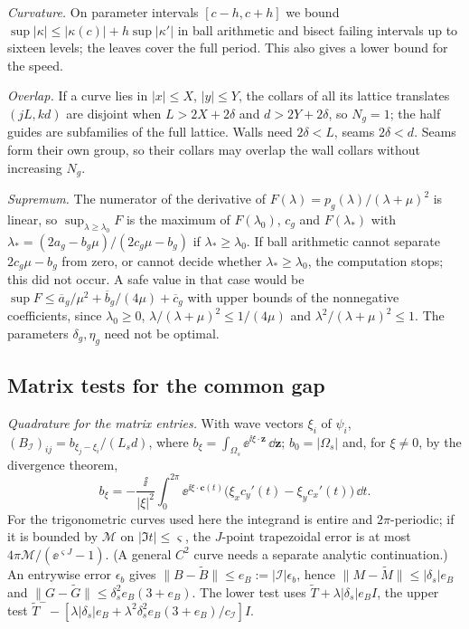 \emph{Curvature.} On parameter intervals $[c-h,c+h]$ we bound
$\sup|\kappa|\le|\kappa(c)|+h\sup|\kappa'|$ in ball arithmetic and bisect failing
intervals up to sixteen levels; the leaves cover the full period. This also gives a
lower bound for the speed.

\emph{Overlap.} If a curve lies in $|x|\le X$, $|y|\le Y$, the collars of all its
lattice translates $(jL,kd)$ are disjoint when $L>2X+2\delta$ and $d>2Y+2\delta$, so
$N_g=1$; the half guides are subfamilies of the full lattice. Walls need $2\delta<L$,
seams $2\delta<d$. Seams form their own group, so their collars may overlap the wall
collars without increasing $N_g$.

\emph{Supremum.} The numerator of the derivative of
$F(\lambda)=p_g(\lambda)/(\lambda+\mu)^2$ is linear, so $\sup_{\lambda\ge\lambda_0}F$ is
the maximum of $F(\lambda_0)$, $c_g$ and $F(\lambda_*)$ with
$\lambda_*=(2a_g-b_g\mu)/(2c_g\mu-b_g)$ if $\lambda_*\ge\lambda_0$. If ball arithmetic
cannot separate $2c_g\mu-b_g$ from zero, or cannot decide whether
$\lambda_*\ge\lambda_0$, the computation stops; this did not occur. A safe value in
that case would be $\sup F\le\overline a_g/\mu^2+\overline b_g/(4\mu)+\overline c_g$
with upper bounds of the nonnegative coefficients, since $\lambda_0\ge0$, $\lambda/(\lambda+\mu)^2\le1/(4\mu)$ and
$\lambda^2/(\lambda+\mu)^2\le1$. The parameters $\delta_g,\eta_g$ need not be optimal.

\subsection{Matrix tests for the common gap}\label{sm:band-tests}
\emph{Quadrature for the matrix entries.} With wave vectors $\xi_i$ of $\psi_i$,
$(B_{\mathcal I})_{ij}=b_{\xi_j-\xi_i}/(L_sd)$, where
$b_\xi=\int_{\Omega_s}\ee^{\ii\xi\cdot\mathbf z}\,\dd\mathbf z$; $b_0=|\Omega_s|$ and, for
$\xi\ne0$, by the divergence theorem,
\[
  b_\xi=-\frac{\ii}{|\xi|^2}\int_0^{2\pi}\ee^{\ii\xi\cdot\boldsymbol c(t)}
  \bigl(\xi_xc_y'(t)-\xi_yc_x'(t)\bigr)\,\dd t .
\]
For the trigonometric curves used here the integrand is entire and $2\pi$-periodic;
if it is bounded by $\mathcal M$ on $|\Im t|\le\varsigma$, the $J$-point trapezoidal
error is at most $4\pi\mathcal M/(\ee^{\varsigma J}-1)$. (A general $C^2$ curve needs
a separate analytic continuation.) An entrywise error $\epsilon_b$ gives
$\|B-\widetilde B\|\le e_B:=|\mathcal I|\epsilon_b$, hence
$\|M-\widetilde M\|\le|\delta_s|e_B$ and $\|G-\widetilde G\|\le\delta_s^2e_B(3+e_B)$. The
lower test uses $\widetilde T+\lambda|\delta_s|e_BI$, the upper test
$\widetilde T^--[\lambda|\delta_s|e_B+\lambda^2\delta_s^2e_B(3+e_B)/c_{\mathcal I}]I$.

